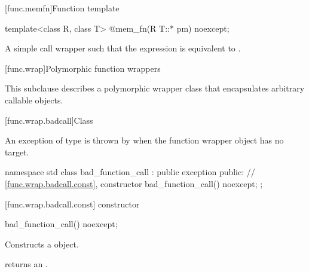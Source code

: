 [func.memfn]{Function template }%

%
\begin{itemdecl}
template<class R, class T> @\unspec@ mem_fn(R T::* pm) noexcept;
\end{itemdecl}

\begin{itemdescr}
\pnum
\returns A simple call wrapper 
such that the expression  is equivalent
to .
\end{itemdescr}

[func.wrap]{Polymorphic function wrappers}%

\pnum
This subclause describes a polymorphic wrapper class that
encapsulates arbitrary callable objects.

[func.wrap.badcall]{Class }%
%

\pnum
An exception of type  is thrown by
when the function wrapper object has no target.

\begin{codeblock}
namespace std {
  class bad_function_call : public exception {
  public:
    // \ref{func.wrap.badcall.const}, constructor
    bad_function_call() noexcept;
  };
}
\end{codeblock}

[func.wrap.badcall.const]{ constructor}

%
%
\begin{itemdecl}
bad_function_call() noexcept;
\end{itemdecl}

\begin{itemdescr}
\pnum\effects Constructs a  object.
\end{itemdescr}

\begin{itemdescr}
\pnum\postconditions  {} returns an
 \ntbs{}.
\end{itemdescr}

